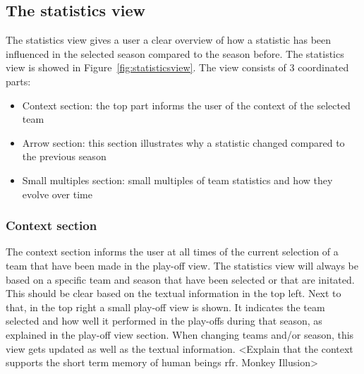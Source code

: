 \documentclass{sigchi}
\begin{document}
\subsection{The statistics view}
The statistics view gives a user a clear overview of how a statistic has been
influenced in the selected season compared to the season before. The statistics
view is showed in Figure~\ref{fig:statisticsview}. The view consists of 3
coordinated parts:
\begin{itemize}
    \item Context section: the top part informs the user of the context of the selected team
    \item Arrow section: this section illustrates why a statistic changed compared to the previous season
    \item Small multiples section: small multiples of team statistics and how they evolve over time
\end{itemize}

\subsubsection{Context section}
The context section informs the user at all times of the current selection of a
team  that have been made in the play-off view. The statistics view will always
be based on a specific team and season that have been selected or that are
initated. This should be clear based on the textual information in the top
left. Next to that, in the top right a small play-off view is shown. It
indicates the team selected and how well it performed in  the play-offs during
that season, as explained in the play-off view section. When changing teams
and/or season, this view gets updated as well as the textual information.
<Explain that the context supports the short term memory of human beings rfr.
Monkey Illusion>
\end{document}

